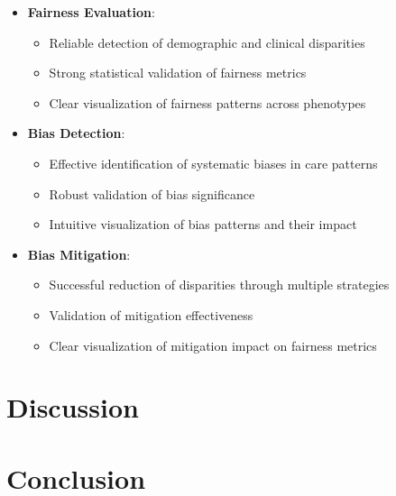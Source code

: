 \documentclass[12pt]{article}
\begin{document}
\begin{itemize}
    \item \textbf{Fairness Evaluation}:
    \begin{itemize}
        \item Reliable detection of demographic and clinical disparities
        \item Strong statistical validation of fairness metrics
        \item Clear visualization of fairness patterns across phenotypes
    \end{itemize}
    
    \item \textbf{Bias Detection}:
    \begin{itemize}
        \item Effective identification of systematic biases in care patterns
        \item Robust validation of bias significance
        \item Intuitive visualization of bias patterns and their impact
    \end{itemize}
    
    \item \textbf{Bias Mitigation}:
    \begin{itemize}
        \item Successful reduction of disparities through multiple strategies
        \item Validation of mitigation effectiveness
        \item Clear visualization of mitigation impact on fairness metrics
    \end{itemize}
\end{itemize}

\section{Discussion}

\section{Conclusion}



\end{document}
